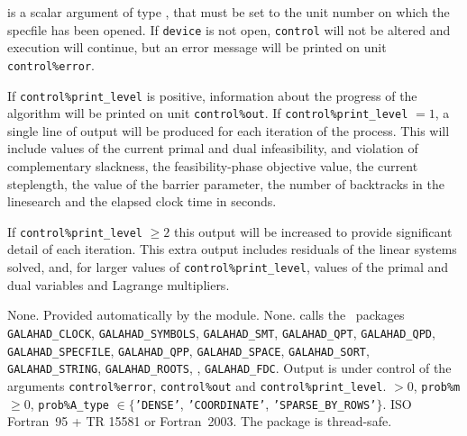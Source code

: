 \documentclass{galahad}
\newcommand{\packagename}{WCP}
\begin{document}
\begin{description}
 is a scalar \intentin argument of type \integer,
that must be set to the unit number on which the specfile
has been opened. If {\tt device} is not open, {\tt control} will
not be altered and execution will continue, but an error message
will be printed on unit {\tt control\%error}.

\end{description}


\galinfo
If {\tt control\%print\_level} is positive, information about the progress 
of the algorithm will be printed on unit {\tt control\-\%out}.
If {\tt control\%print\_level} $= 1$, a single line of output will be produced 
for each iteration of the process. 
This will include values of the current primal and dual infeasibility, and
violation of complementary slackness, the feasibility-phase objective value,
the current steplength, the value of the barrier parameter, the
number of backtracks in the linesearch and the elapsed clock time in seconds.

If {\tt control\%print\_level} $\geq 2$ this 
output will be increased to provide significant detail of each iteration. 
This extra output includes residuals of the linear systems solved, and,
for larger values of {\tt control\%print\_level}, values of the primal and dual
variables and Lagrange multipliers. 


\galgeneral

\galcommon None.
\galworkspace Provided automatically by the module.
\galroutines None. 
\galmodules {\tt \packagename\_solve} calls the \galahad\ packages
{\tt GALAHAD\_\-CLOCK},
{\tt GALAHAD\_SY\-M\-BOLS}, 
{\tt GALAHAD\_SMT},
{\tt GALAHAD\_QPT}, {\tt GALAHAD\_QPD}, {\tt GALAHAD\_SPECFILE}, 
{\tt GALAHAD\_QPP}, {\tt GALAHAD\_SPACE}, {\tt GALAHAD\_SORT}, 
{\tt GALAHAD\_STRING}, {\tt GALAHAD\_\-ROOTS}, ,
{\tt GALAHAD\_FDC}.
\galio Output is under control of the arguments
 {\tt control\%error}, {\tt control\%out} and {\tt control\%print\_level}.
 $> 0$, {\tt prob\%m} $\geq  0$, 
{\tt prob\%A\_type} $\in \{${\tt 'DENSE'}, 
 {\tt 'COORDINATE'}, {\tt 'SPARSE\_BY\_ROWS'}$\}$. 
\galportability ISO Fortran~95 + TR 15581 or Fortran~2003. 
The package is thread-safe.

\end{document}

